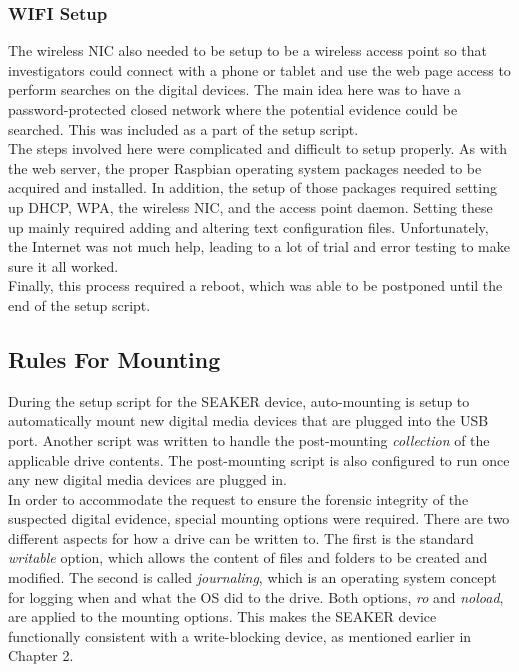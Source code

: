 \documentclass[12pt]{article}
\begin{document}
\subsubsection{WIFI Setup}

The wireless NIC also needed to be setup to be a wireless access point so that
investigators could connect with a phone or tablet and use the web page access
to perform searches on the digital devices.  The main idea here was to have a 
password-protected closed network where the potential evidence could be searched.
This was included as a part of the setup script.\\

The steps involved here were complicated and difficult to setup properly.  As
with the web server, the proper Raspbian operating system packages needed to be
acquired and installed.  In addition, the setup of those packages required 
setting up DHCP, WPA, the wireless NIC, and the access point daemon.  Setting
these up mainly required adding and altering text configuration files.  
Unfortunately, the Internet was not much help, leading to a lot of trial and 
error testing to make sure it all worked.\\

Finally, this process required a reboot, which was able to be postponed until
the end of the setup script.\\

\subsection{Rules For Mounting}

During the setup script for the SEAKER device, auto-mounting is setup to
automatically mount new digital media devices that are plugged into the USB
port.  Another script was written to handle the post-mounting {\em collection}
of the applicable drive contents.  The post-mounting script is also
configured to run once any new digital media devices are plugged in.\\

In order to accommodate the request to ensure the forensic integrity of the
suspected digital evidence, special mounting options were required.  There
are two different aspects for how a drive can be written to.  The first is
the standard {\em writable} option, which allows the content of files and
folders to be created and modified.  The second is called {\em journaling},
which is an operating system concept for logging when and what the OS 
did to the drive.  Both options, {\em ro} and {\em noload}, are applied to
the mounting options.  This makes the SEAKER device functionally consistent
with a write-blocking device, as mentioned earlier in Chapter 2.\\
\end{document}
